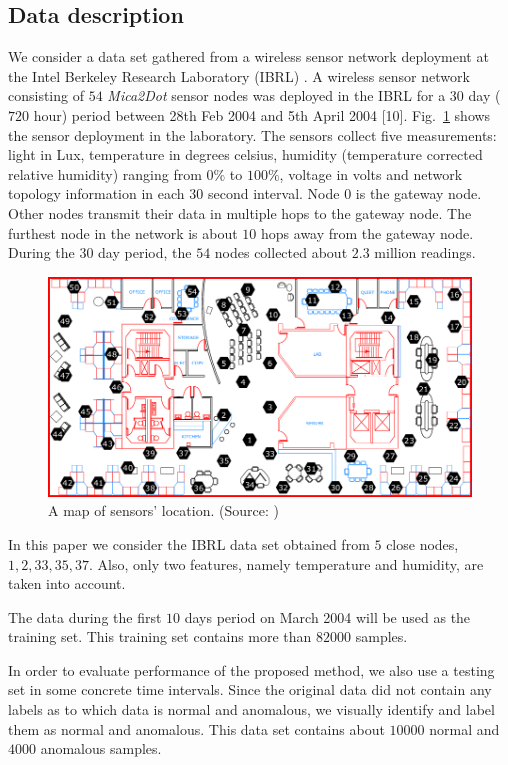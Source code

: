 \documentclass[conference]{IEEEtran}
\theoremstyle{problemstyle}
\begin{document}
\subsection{Data description}

We consider a data set gathered from a wireless sensor network deployment at the Intel Berkeley Research Laboratory (IBRL) \cite{Buonadonna2005}. A wireless sensor network consisting of $54$ \emph{Mica2Dot} sensor nodes was deployed in the IBRL for a $30$ day ($720$ hour) period between 28th Feb 2004 and 5th April 2004 [10]. Fig.~\ref{fig:sensor_map} shows the sensor deployment in the laboratory. The sensors collect five measurements: light in Lux, temperature in degrees celsius, humidity (temperature corrected relative humidity) ranging from $0\%$ to $100\%$, voltage in volts and network topology information in each $30$ second interval. Node $0$ is the gateway node. Other nodes transmit their data in multiple hops to the gateway node. The furthest node in the network is about $10$ hops away from the gateway node. During the $30$ day period, the $54$ nodes collected about $2.3$ million readings.

\begin{figure}[H]
\centering
\includegraphics[scale=.25]{Figs/ibrl_wsn.png}
\caption{A map of sensors' location. (Source: \cite{Buonadonna2005})}
\label{fig:sensor_map}
\end{figure}

In this paper we consider the IBRL data set obtained from $5$ close nodes, $1, 2, 33, 35, 37$. Also, only two features, namely temperature and humidity, are taken into account. 

The data during the first $10$ days period on March 2004 will be used as the training set. This training set contains more than $82000$ samples. 

In order to evaluate performance of the proposed method, we also use a testing set in some concrete time intervals. Since the original data did not contain any labels as to which data is normal and anomalous, we visually identify and label them as normal and anomalous. This data set contains about $10000$ normal and $4000$ anomalous samples.
\end{document}
